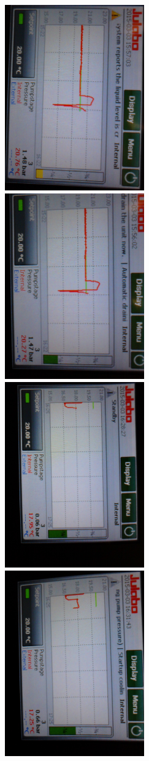 \begin{figure}
    \includegraphics[angle=90,width=6cm]{figures/chiller_level1}
    \includegraphics[angle=90,width=6cm]{figures/chiller_level2}
    \includegraphics[angle=90,width=6cm]{figures/chiller_level3}
    \includegraphics[angle=90,width=6cm]{figures/chiller_level4}

\end{figure}
